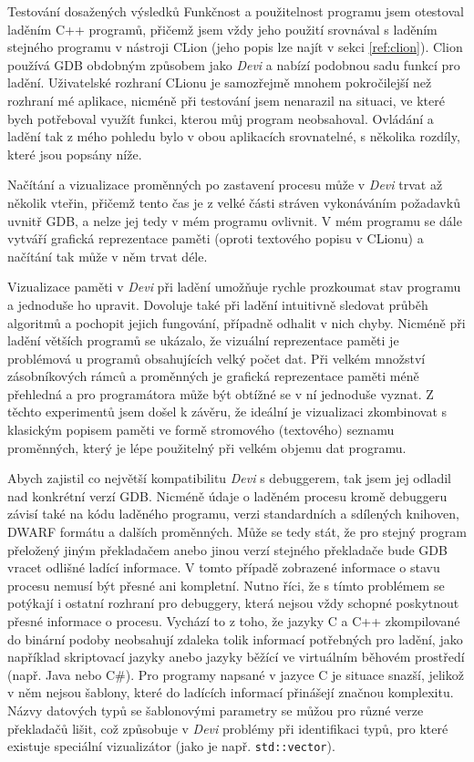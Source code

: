 \documentclass[czech,bachelor,male,python,dept460]{diploma}						%
\newcommand{\parspace}[1][]{
	\ifthenelse{\isempty{#1}}{\vspace{5mm}}{\vspace{#1}}
	\par
}
\begin{document}
\begin{section}{Testování dosažených výsledků}
	Funkčnost a použitelnost programu jsem otestoval laděním C++ programů, přičemž jsem vždy jeho použití srovnával s laděním stejného programu v nástroji
	CLion (jeho popis lze najít v sekci \ref{ref:clion}). Clion používá GDB obdobným způsobem jako \textit{Devi} a nabízí podobnou sadu funkcí pro ladění.
	Uživatelské rozhraní CLionu je samozřejmě mnohem pokročilejší než rozhraní mé aplikace, nicméně při testování jsem nenarazil na situaci,
	ve které bych potřeboval využít funkci, kterou můj program neobsahoval. Ovládání a ladění tak z mého pohledu bylo v obou aplikacích srovnatelné,
	s několika rozdíly, které jsou popsány níže.

	\parspace Načítání a vizualizace proměnných po zastavení procesu může v \textit{Devi} trvat až několik vteřin, přičemž tento čas je z velké části stráven
	vykonáváním požadavků uvnitř GDB, a nelze jej tedy v mém programu ovlivnit. V mém programu se dále vytváří grafická reprezentace paměti
	(oproti textového popisu v CLionu) a načítání tak může v něm trvat déle.

	\parspace Vizualizace paměti v \textit{Devi} při ladění umožňuje rychle prozkoumat stav programu a jednoduše ho upravit.
	Dovoluje také při ladění intuitivně sledovat průběh algoritmů a pochopit jejich fungování, případně odhalit v nich chyby.
	Nicméně při ladění větších programů se ukázalo, že vizuální reprezentace paměti je problémová u programů obsahujících velký počet dat.
	Při velkém množství zásobníkových rámců a proměnných je grafická reprezentace paměti méně přehledná a pro programátora může být obtížné se v ní
	jednoduše vyznat. Z těchto experimentů jsem došel k závěru, že ideální je vizualizaci zkombinovat s klasickým popisem paměti ve formě stromového
	(textového) seznamu proměnných, který je lépe použitelný při velkém objemu dat programu.
	
	\parspace Abych zajistil co největší kompatibilitu \textit{Devi} s debuggerem, tak jsem jej odladil nad konkrétní verzí GDB. Nicméně údaje o laděném procesu kromě
	debuggeru závisí také na kódu laděného programu, verzi standardních a sdílených knihoven, DWARF formátu a dalších proměnných.
	Může se tedy stát, že pro stejný program přeložený jiným překladačem anebo jinou verzí stejného překladače bude GDB vracet odlišné ladící informace.
	V tomto případě zobrazené informace o stavu procesu nemusí být přesné ani kompletní. Nutno říci, že s tímto problémem
	se potýkají i ostatní rozhraní pro debuggery, která nejsou vždy schopné poskytnout přesné informace o procesu. Vychází to z toho, že jazyky C a
	C++ zkompilované do binární podoby neobsahují zdaleka tolik informací potřebných pro ladění, jako například skriptovací jazyky anebo jazyky běžící
	ve virtuálním běhovém prostředí (např. Java nebo C\#). Pro programy napsané v jazyce C je situace snazší, jelikož v něm nejsou šablony, které do ladících
	informací přinášejí značnou komplexitu. Názvy datových typů se šablonovými parametry se můžou pro různé verze překladačů lišit, což způsobuje v \textit{Devi}
	problémy při identifikaci typů, pro které existuje speciální vizualizátor (jako je např. \texttt{std::vector}).
\end{section}
\end{document}
